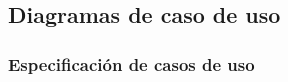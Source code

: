         \subsection{Diagramas de caso de uso}
    		    
	      
        
        \newpage                
             \subsubsection{Especificación de casos de uso}
                
                        
                
                        
                 
                        
                  
                       
                  
                        
                  
                        
                  
                        
                  
                       
                  
                        
                  
                        
                  
                        
                  
                        
                  
                      
                  
                  
